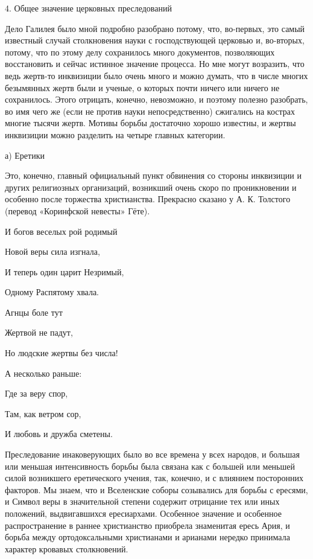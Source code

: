 4. Общее значение церковных преследований

Дело Галилея было мной подробно разобрано потому, что, во-первых, это самый
известный случай столкновения науки с господствующей церковью и, во-вторых,
потому, что по этому делу сохранилось много документов, позволяющих
восстановить и сейчас истинное значение процесса. Но мне могут возразить, что
ведь жертв-то инквизиции было очень много и можно думать, что в числе многих
безымянных жертв были и ученые, о которых почти ничего или ничего не
сохранилось. Этого отрицать, конечно, невозможно, и поэтому полезно разобрать,
во имя чего же (если не против науки непосредственно) сжигались на кострах
многие тысячи жертв. Мотивы борьбы достаточно хорошо известны, и жертвы
инквизиции можно разделить на четыре главных категории.

а) Еретики

Это, конечно, главный официальный пункт обвинения со стороны инквизиции и
других религиозных организаций, возникший очень
скоро по проникновении и особенно после торжества христианства. Прекрасно
сказано у А. К. Толстого (перевод «Коринфской невесты» Гёте).

И богов веселых рой родимый

Новой веры сила изгнала,

И теперь один царит Незримый,

Одному Распятому хвала.

Агнцы боле тут

Жертвой не падут,

Но людские жертвы без числа!

А несколько раньше:

Где за веру спор,

Там, как ветром сор,

И любовь и дружба сметены.

Преследование инаковерующих было во все времена у всех народов, и большая или
меньшая интенсивность борьбы была связана как с большей или меньшей силой
возникшего еретического учения, так, конечно, и с влиянием посторонних
факторов. Мы знаем, что и Вселенские соборы созывались для борьбы с ересями, и
Символ веры в значительной степени содержит отрицание тех или иных положений,
выдвигавшихся ересиархами. Особенное значение и особенное распространение в
раннее христианство приобрела знаменитая ересь Ария, и борьба между
ортодоксальными христианами и арианами нередко принимала характер кровавых
столкновений.


